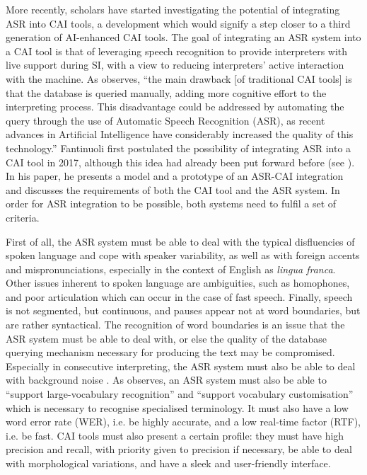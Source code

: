 More recently, scholars have started investigating the potential of integrating ASR into CAI tools, a development which would signify a step closer to a third generation of AI-enhanced CAI tools. The goal of integrating an ASR system into a CAI tool is that of leveraging speech recognition to provide interpreters with live support during SI, with a view to reducing interpreters' active interaction with the machine. As \citet[25]{fantinuoli_speech_2017} observes, ``the main drawback [of traditional CAI tools] is that the database is queried manually, adding more cognitive effort to the interpreting process. This disadvantage could be addressed by automating the query through the use of Automatic Speech Recognition (ASR), as recent advances in Artificial Intelligence have considerably increased the quality of this technology.'' Fantinuoli first postulated the possibility of integrating ASR into a CAI tool in 2017, although this idea had already been put forward before (see \citealt{hansen2012nutzbarkeit}). In his paper, he presents a model and a prototype of an ASR-CAI integration and discusses the requirements of both the CAI tool and the ASR system. In order for ASR integration to be possible, both systems need to fulfil a set of criteria.

First of all, the ASR system must be able to deal with the typical disfluencies of spoken language and cope with speaker variability, as well as with foreign accents and mispronunciations, especially in the context of English as \textit{lingua franca}. Other issues inherent to spoken language are ambiguities, such as homophones, and poor articulation which can occur in the case of fast speech. Finally, speech is not segmented, but continuous, and pauses appear not at word boundaries, but are rather syntactical. The recognition of word boundaries is an issue that the ASR system must be able to deal with, or else the quality of the database querying mechanism necessary for producing the text may be compromised. Especially in consecutive interpreting, the ASR system must also be able to deal with background noise \citep[28]{fantinuoli_speech_2017}. As \citet[29]{fantinuoli_speech_2017} observes, an ASR system must also be able to ``support large-vocabulary recognition'' and ``support vocabulary customisation'' which is necessary to recognise specialised terminology. It must also have a low word error rate (WER), i.e. be highly accurate, and a low real-time factor (RTF), i.e. be fast. CAI tools must also present a certain profile: they must have high precision and recall, with priority given to precision if necessary, be able to deal with morphological variations, and have a sleek and user-friendly interface.


